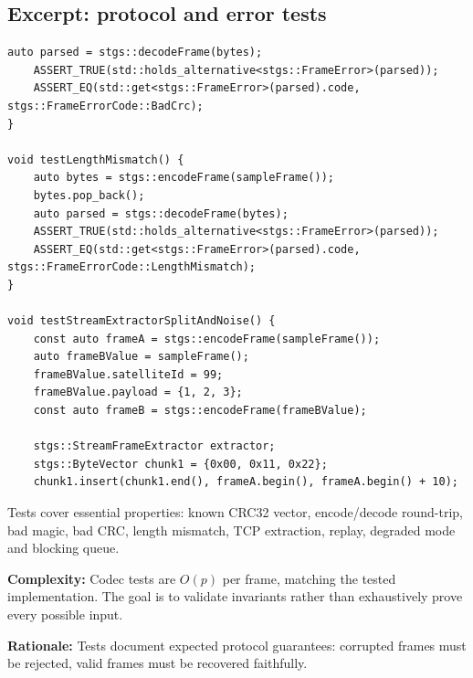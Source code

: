 \documentclass[10pt,a4paper]{article}
\newcommand{\complexity}[1]{\textbf{Complexity:} #1}
\newcommand{\rationale}[1]{\textbf{Rationale:} #1}
\begin{document}
\subsection{Excerpt: protocol and error tests}
\begin{lstlisting}[caption={Tests for CRC, round-trip and errors}]
    auto parsed = stgs::decodeFrame(bytes);
    ASSERT_TRUE(std::holds_alternative<stgs::FrameError>(parsed));
    ASSERT_EQ(std::get<stgs::FrameError>(parsed).code, stgs::FrameErrorCode::BadCrc);
}

void testLengthMismatch() {
    auto bytes = stgs::encodeFrame(sampleFrame());
    bytes.pop_back();
    auto parsed = stgs::decodeFrame(bytes);
    ASSERT_TRUE(std::holds_alternative<stgs::FrameError>(parsed));
    ASSERT_EQ(std::get<stgs::FrameError>(parsed).code, stgs::FrameErrorCode::LengthMismatch);
}

void testStreamExtractorSplitAndNoise() {
    const auto frameA = stgs::encodeFrame(sampleFrame());
    auto frameBValue = sampleFrame();
    frameBValue.satelliteId = 99;
    frameBValue.payload = {1, 2, 3};
    const auto frameB = stgs::encodeFrame(frameBValue);

    stgs::StreamFrameExtractor extractor;
    stgs::ByteVector chunk1 = {0x00, 0x11, 0x22};
    chunk1.insert(chunk1.end(), frameA.begin(), frameA.begin() + 10);
\end{lstlisting}


Tests cover essential properties: known CRC32 vector, encode/decode round-trip, bad magic, bad CRC, length mismatch, TCP extraction, replay, degraded mode and blocking queue.

\complexity{Codec tests are $O(p)$ per frame, matching the tested implementation. The goal is to validate invariants rather than exhaustively prove every possible input.}

\rationale{Tests document expected protocol guarantees: corrupted frames must be rejected, valid frames must be recovered faithfully.}
\end{document}
